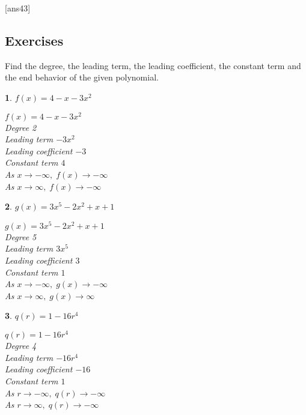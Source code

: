 \documentclass{amsbook}
\newtheorem{exc}{}
\newenvironment{ex}{\begin{exc}\normalfont}{\end{exc}}
\numberwithin{section}{chapter}
\numberwithin{equation}{chapter}
\begin{document}
[ans43]
\subsection*{Exercises \nopunct} \hfill

Find the degree, the leading term, the leading coefficient, the constant term and the end behavior of the given polynomial.

\begin{multicols}{2}

\begin{ex}
	$f(x) = 4-x-3x^2$ 
	\begin{sol}
		$f(x) = 4-x-3x^2$ \\
		Degree 2 \\
		Leading term $-3x^{2}$\\
		Leading coefficient $-3$\\
		Constant term $4$\\
		As $x \rightarrow -\infty, \; f(x) \rightarrow -\infty$\\
		As $x \rightarrow \infty, \; f(x) \rightarrow -\infty$
	\end{sol}
\end{ex}

\begin{ex}
	 $g(x) = 3x^5 - 2x^2 + x + 1$
	\begin{sol}
		$g(x) = 3x^5 - 2x^2 + x + 1$ \\
		Degree 5 \\
		Leading term $3x^5$\\
		Leading coefficient $3$\\
		Constant term $1$\\
		As $x \rightarrow -\infty, \; g(x) \rightarrow -\infty$\\
		As $x \rightarrow \infty, \; g(x) \rightarrow \infty$
	\end{sol}
\end{ex}

\begin{ex}
	$q(r) = 1 - 16r^{4}$
	\begin{sol}
		$q(r) = 1 - 16r^{4}$\\
		Degree 4 \\
		Leading term $-16r^{4}$\\
		Leading coefficient $-16$\\
		Constant term $1$\\
		As $r \rightarrow -\infty, \; q(r) \rightarrow -\infty$\\
		As $r \rightarrow \infty, \; q(r) \rightarrow -\infty$
	\end{sol}
\end{ex}


\end{multicols}
\end{document}
